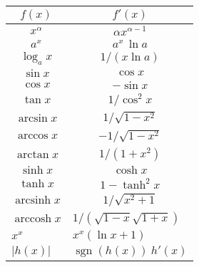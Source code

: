 \documentclass{article}
\DeclareMathOperator{\arccosh}{arccosh}
\DeclareMathOperator{\arcsinh}{arcsinh}
\newcommand{\sgn}{\mathop{\mathrm{sgn}}}
\begin{document}
\begin{table}[ht]
\begin{center}
    \begin{tabular}{|c|c|}
    \hline
    $f(x)$                              & $f'(x)$                                         \\ \hline
    $x^\alpha$                          & $\alpha x^{\alpha-1}$                           \\ \hline
    $a^x$                               & $a^x\,\ln{a}$                                   \\ \hline
    $\log_{a}{x}$                       & $1/(x\ln{a})$                                   \\ \hline
    $\sin{x}$                           & $\cos{x}$                                       \\ \hline
    $\cos{x}$                           & $-\sin{x}$                                      \\ \hline
    $\tan{x}$                           & $1/\cos^2{x}$                                   \\ \hline
    $\arcsin{x}$                        & $1/\sqrt{1-x^2}$                                \\ \hline
    $\arccos{x}$                        & $-1/\sqrt{1-x^2}$                               \\ \hline
    $\arctan{x}$                        & $1/(1+x^2)$                                     \\ \hline
    $\sinh{x}$                          & $\cosh{x}$                                      \\ \hline
    $\tanh{x}$                          & $1-\tanh^2{x}$                                  \\ \hline
    $\arcsinh{x}$                       & $1/\sqrt{x^2+1}$                                \\ \hline
    \multicolumn{1}{|l|}{$\arccosh{x}$} & \multicolumn{1}{l|}{$1/(\sqrt{1-x}\sqrt{1+x})$} \\ \hline
    \multicolumn{1}{|l|}{$x^x$}         & \multicolumn{1}{l|}{$x^x(\ln{x}+1)$}            \\ \hline
    \multicolumn{1}{|l|}{$|h(x)|$}      & \multicolumn{1}{l|}{$\sgn{(h(x))}\ h'(x)$}        \\ \hline
    \end{tabular}
\end{center}
\end{table}


















                                                
\end{document}
